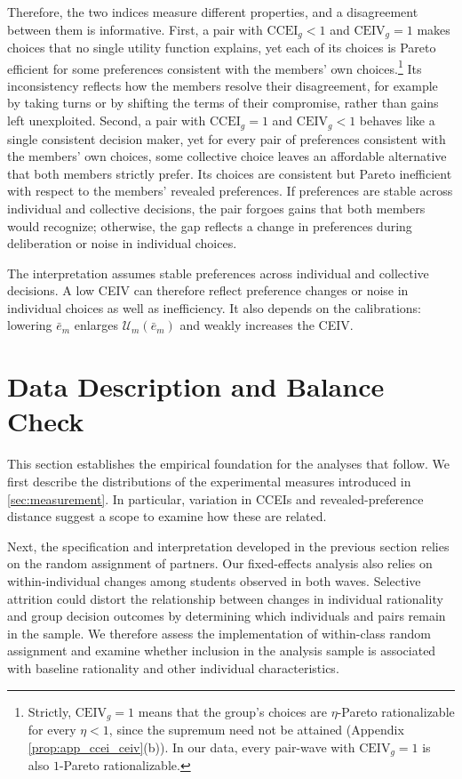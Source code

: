 \documentclass[11 pt]{article}
\begin{document}
Therefore, the two indices measure different properties, and a disagreement between them is informative. First, a pair with $\mathrm{CCEI}_g<1$ and $\mathrm{CEIV}_g=1$ makes choices that no single utility function explains, yet each of its choices is Pareto efficient for some preferences consistent with the members' own choices.\footnote{Strictly, $\mathrm{CEIV}_g=1$ means that the group's choices are $\eta$-Pareto rationalizable for every $\eta<1$, since the supremum need not be attained (Appendix \autoref{prop:app_ccei_ceiv}(b)). In our data, every pair-wave with $\mathrm{CEIV}_g=1$ is also $1$-Pareto rationalizable.} Its inconsistency reflects how the members resolve their disagreement, for example by taking turns or by shifting the terms of their compromise, rather than gains left unexploited. Second, a pair with $\mathrm{CCEI}_g=1$ and $\mathrm{CEIV}_g<1$ behaves like a single consistent decision maker, yet for every pair of preferences consistent with the members' own choices, some collective choice leaves an affordable alternative that both members strictly prefer. Its choices are consistent but Pareto inefficient with respect to the members' revealed preferences. If preferences are stable across individual and collective decisions, the pair forgoes gains that both members would recognize; otherwise, the gap reflects a change in preferences during deliberation or noise in individual choices.

The interpretation assumes stable preferences across individual and collective decisions. A low CEIV can therefore reflect preference changes or noise in individual choices as well as inefficiency. It also depends on the calibrations: lowering $\bar e_m$ enlarges $\mathcal U_m(\bar e_m)$ and weakly increases the CEIV.



\section{Data Description and Balance Check}

This section establishes the empirical foundation for the analyses that follow. We first describe the distributions of the experimental measures introduced in \autoref{sec:measurement}. In particular, variation in CCEIs and revealed-preference distance suggest a scope to examine how these are related.

Next, the specification and interpretation developed in the previous section relies on the random assignment of partners. Our fixed-effects analysis also relies on within-individual changes among students observed in both waves. Selective attrition could distort the relationship between changes in individual rationality and group decision outcomes by determining which individuals and pairs remain in the sample. We therefore assess the implementation of within-class random assignment and examine whether inclusion in the analysis sample is associated with baseline rationality and other individual characteristics.
\end{document}
